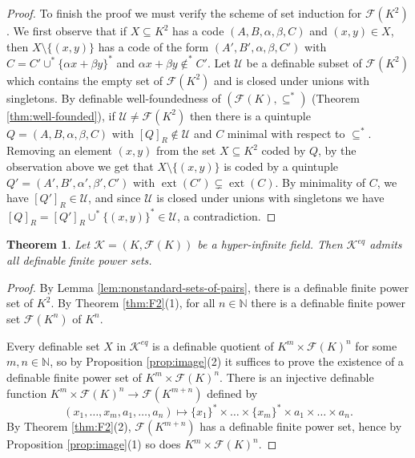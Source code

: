 \documentclass{amsart}
\newcommand{\N}{\mathbb N}
\newcommand{\ca}{\mathcal}
\newcommand{\nin}{\not \in}
\theoremstyle{plain}
\newtheorem{thm}{Theorem}[section]
\theoremstyle{definition}
\newcommand{\F}{\mathcal{F}}
\newcommand{\ext}[1]{\operatorname{ext}(#1)}
\begin{document}
\begin{proof}
To finish the proof we must verify the scheme of set induction for $\F(K^2)$. We first observe that if $X\subseteq K^2$ has a code $(A,B,\alpha,\beta,C)$ and $(x,y)\in X$, then $X \setminus \{(x,y)\}$ has a code of the form $(A',B',\alpha,\beta,C')$ with $C=C' \cup^* \{\alpha x +\beta y \}^*$ and $\alpha x  + \beta y \nin^* C'$. Let $\mathcal{U}$ be a definable subset of $\F(K^2)$ which contains the empty set of $\F(K^2)$ and is closed under unions with singletons. By definable well-foundedness of $(\F(K),\subseteq^*)$ (Theorem \ref{thm:well-founded}), if $\ca U \neq \F(K^2)$ then there is a quintuple $Q=(A,B,\alpha,\beta,C)$ with $[Q]_R \notin \ca U$ and $C$ minimal with respect to $\subseteq^*$. Removing an element $(x,y)$ from the set $X\subseteq K^2$ coded by $Q$, by the observation above we get that $X \setminus \{(x,y)\}$ is coded by a quintuple $Q'=(A',B',\alpha',\beta',C')$ with $\ext{C'} \subsetneq \ext{C}$. By minimality of $C$, we have $[Q']_R \in \ca U$, and since $\ca U$ is closed under unions with singletons we have $[Q]_R=[Q']_R \cup^*\{(x,y)\}^* \in \ca U$, a contradiction.
\end{proof}

\begin{thm}\label{thm:field power}
Let $\ca K = (K,\F(K))$ be a hyper-infinite field. Then $\ca K^{eq}$ admits all definable finite power sets. 
\end{thm} 
\begin{proof}
By Lemma \ref{lem:nonstandard-sets-of-pairs}, there is a definable finite power set of $K^2$. By Theorem \ref{thm:F2}(1), for all $n\in \N$ there is a definable finite power set $\F(K^n)$ of $K^n$. 

Every definable set $X$ in $\ca K^{eq}$ is a definable quotient of $K^m \times \F(K)^n$ for some $m,n\in \N$, so by Proposition \ref{prop:image}(2) it suffices to prove the existence of a definable finite power set of $K^m \times \F(K)^n$. There is an injective definable function $K^m \times \F(K)^n \to \F(K^{m+n})$ defined by \[(x_1,\dots,x_m,a_1,\dots,a_n) \mapsto \{x_1\}^* \times \dots \times \{x_m\}^* \times a_1 \times \dots \times a_n.\]
 By Theorem \ref{thm:F2}(2), $\F(K^{m+n})$ has a definable finite power set, hence by Proposition \ref{prop:image}(1) so does $K^m \times \F(K)^n$.
\end{proof}
\end{document}
